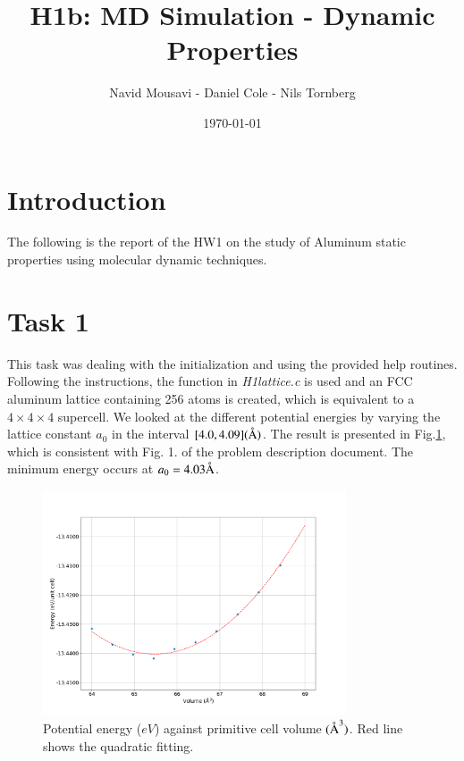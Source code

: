 
\title{H1b: MD Simulation - Dynamic Properties}
\newcommand{\angstrom}{\mbox{\normalfont\AA}}
\usepackage{gensymb}
\usepackage{caption}
\usepackage{subcaption}

\author{Navid Mousavi - Daniel Cole - Nils Tornberg}
\date{\today}





\section*{Introduction}

The following is the report of the HW1 on the study of Aluminum static properties using molecular dynamic techniques.


\section*{Task 1}
This task was dealing with the initialization and using the provided help routines. Following the instructions, the function in \textit{H1lattice.c} is used and an FCC aluminum lattice containing 256 atoms is created, which is equivalent to a $4\times4\times4$ supercell. We looked at the different potential energies by varying the lattice constant $a_0$ in the interval $[4.0,4.09] (\angstrom)$. The result is presented in Fig.\ref{fig1}, which is consistent with Fig. 1. of the problem description document. The minimum energy occurs at $a_0 = 4.03 \angstrom$. 

\begin{figure}[!ht]
\begin{center}
  \includegraphics[width=0.8\textwidth]{task1.png} 
  \caption{Potential energy ($eV$) against primitive cell volume $(\angstrom^3)$. Red line shows the quadratic fitting.}
  \label{fig1}
\end{center}
\end{figure}
  
